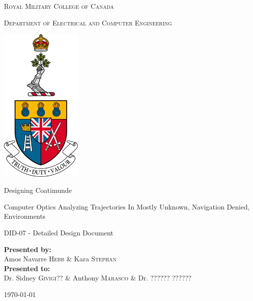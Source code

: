 \documentclass{article}
\begin{document}
	
\begin{titlepage}
	\begin{center}
		\vspace*{1cm}
		
		\LARGE\textsc{Royal Military College of Canada}\normalsize
		
		\vspace{0.2cm}
		
		\textsc{Department of Electrical and Computer Engineering}
		
		\vspace{1.5cm}
		
		\includegraphics[width=0.3\textwidth]{rmcLogo.png}
		
		\vspace{1.5cm}
		
		\LARGE{Designing Coatimunde\\}
		
		\vspace{0.2cm}
		
		\normalsize{Computer Optics Analyzing Trajectories In Mostly Unknown, Navigation Denied, Environments}
		
		\vspace{0.1cm}
		
		\normalsize{DID-07 - Detailed Design Document}
		
		\vfill
		
		\textbf{Presented by:}\\Amos Navarre \textsc{Hebb} \& Kara \textsc{Stephan}\\
		\vspace{0.8cm}
		\textbf{Presented to:}\\Dr. Sidney \textsc{Givigi??} \& Anthony \textsc{Marasco} \& Dr. ?????? \textsc{??????} 
		\vspace{0.8cm}
		
		\today
		
	\end{center}
\end{titlepage}
\end{document}
